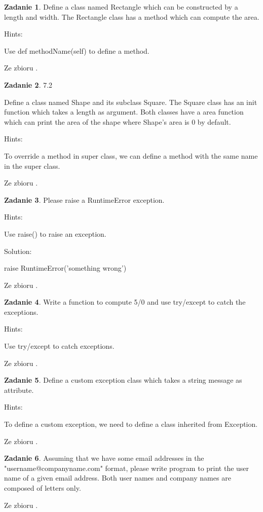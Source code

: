 \documentclass[11pt]{article}
\theoremstyle{definition}
\newtheorem{zadanie}{Zadanie}
\newcommand{\fromA}{\small Ze zbioru \cite{python100}.}
\begin{document}
\begin{zadanie}
Define a class named Rectangle which can be constructed by a length and width. The Rectangle class has a method which can compute the area. 

Hints:

Use def methodName(self) to define a method.


\fromA
\end{zadanie}
\begin{zadanie}
7.2

Define a class named Shape and its subclass Square. The Square class has an init function which takes a length as argument. Both classes have a area function which can print the area of the shape where Shape's area is 0 by default.

Hints:

To override a method in super class, we can define a method with the same name in the super class.


\fromA
\end{zadanie}
\begin{zadanie}
Please raise a RuntimeError exception.

Hints:

Use raise() to raise an exception.

Solution:

raise RuntimeError('something wrong')

\fromA
\end{zadanie}
\begin{zadanie}
Write a function to compute 5/0 and use try/except to catch the exceptions.

Hints:

Use try/except to catch exceptions.


\fromA
\end{zadanie}
\begin{zadanie}
Define a custom exception class which takes a string message as attribute.

Hints:

To define a custom exception, we need to define a class inherited from Exception.


\fromA
\end{zadanie}
\begin{zadanie}
Assuming that we have some email addresses in the "username@companyname.com" format, please write program to print the user name of a given email address. Both user names and company names are composed of letters only.

\fromA
\end{zadanie}
\end{document}
